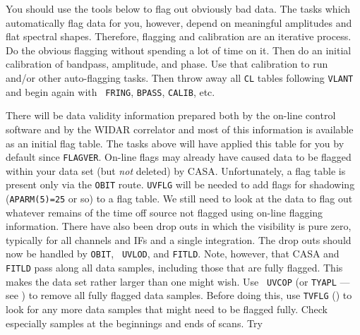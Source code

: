 
You should use the tools below to flag out obviously bad data.  The
tasks which automatically flag data for you, however, depend on
meaningful amplitudes and flat spectral shapes.  Therefore, flagging
and calibration are an iterative process.  Do the obvious flagging
without spending a lot of time on it.  Then do an initial calibration
of bandpass, amplitude, and phase.  Use that calibration to run {\tt
{}} and/or other auto-flagging tasks.  Then throw away all
{\tt CL} tables following {\tt VLANT} and begin again with {\tt
FRING}, {\tt BPASS}, {\tt CALIB}, etc.

There will be data validity information prepared both by the on-line
control software and by the WIDAR correlator and most of this
information is available as an initial flag table.  The tasks above
will have applied this table for you by default since {\tt FLAGVER}.  On-line flags may already have caused data to be flagged within
your data set (but {\it not} deleted) by CASA\@.  Unfortunately, a
flag table is present only via the {\tt OBIT} route.  {\tt UVFLG} will
be needed to add flags for shadowing ({\tt APARM(5)=25} or so) to a
flag table.  We still need to look at the data to flag out whatever
remains of the time off source not flagged using on-line flagging
information.  There have also been drop outs in which the visibility
is pure zero, typically for all channels and IFs and a single
integration.  The drop outs should now be handled by {\tt OBIT}, {\tt
UVLOD}, and {\tt FITLD}\@.  Note, however, that CASA and {\tt FITLD}
pass along all data samples, including those that are fully flagged.
This makes the data set rather larger than one might wish.  Use {\tt
UVCOP} (or {\tt TYAPL} --- see ) to remove all fully
flagged data samples.  Before doing this, use {\tt TVFLG}
() to look for any more data samples that might need to be
flagged fully.  Check especially samples at the beginnings and ends of
scans.  Try
